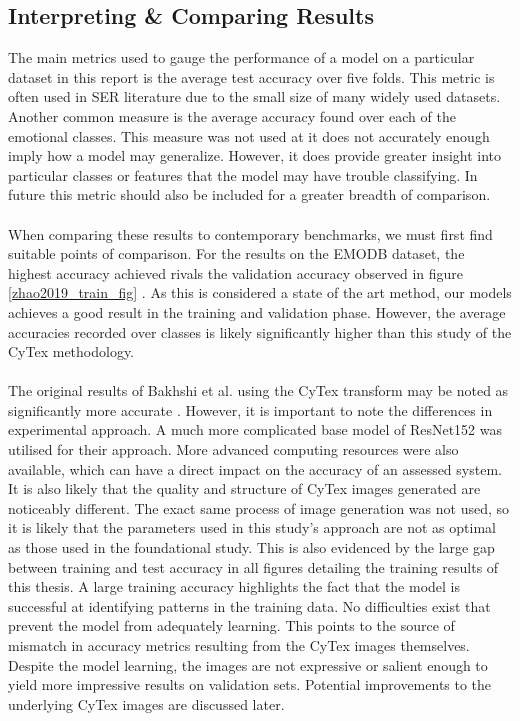 \subsection{Interpreting \& Comparing Results}
The main metrics used to gauge the performance of a model on a particular dataset in this report is the average test accuracy over five folds. This metric is often used in SER  literature due to the small  size of many widely used datasets. Another common measure is the average accuracy found over each of the emotional classes. This measure was not used at it does not accurately enough imply how a model may generalize. However, it does provide greater insight into particular classes or features that the model may have trouble classifying. In future this metric should also be included for a greater breadth of comparison.\\ \\
When comparing these results to contemporary benchmarks, we must first find suitable points of comparison. For the results on the EMODB dataset, the highest accuracy achieved rivals the validation accuracy observed in figure \ref{zhao2019_train_fig} \cite{ZHAO2019}. As this is considered a state  of the art method, our models achieves a good result in the training and validation phase. However, the average accuracies recorded over classes is likely significantly higher than this study of the CyTex methodology.\\ \\
The original results of Bakhshi et al. using the CyTex transform may be noted as significantly more accurate \cite{CyTexRef}. However, it is important to note the differences in experimental approach. A much more complicated base model of ResNet152 was utilised for their approach. More advanced computing resources were also available, which can have a direct impact on the accuracy of an assessed system. It is also likely that the quality and structure of CyTex images generated are noticeably different. The exact same process of image generation was not used, so it is likely that the parameters used in this study's approach are not as optimal as those used in the foundational study. This is also evidenced by the large gap between training and test accuracy in all figures detailing the training results of this thesis. A large training accuracy highlights the fact that the model is successful at identifying patterns in the training data. No difficulties exist that prevent the model from adequately learning. This points to the source of mismatch in accuracy metrics resulting from the CyTex images themselves. Despite the model learning, the images are not expressive or salient enough to yield more impressive results on validation sets. Potential improvements to the underlying CyTex images are discussed later.\\ \\
